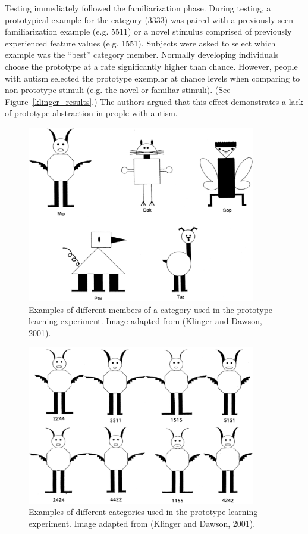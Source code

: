 Testing immediately followed the familiarization phase.  During testing, a prototypical example for the category (3333) was paired with a previously seen familiarization example (e.g. 5511) or a novel stimulus comprised of previously experienced feature values (e.g. 1551).  Subjects were asked to select which example was the ``best'' category member.  Normally developing individuals choose the prototype at a rate significantly higher than chance.  However, people with autism selected the prototype exemplar at chance levels when comparing to non-prototype stimuli (e.g. the novel or familiar stimuli). (See Figure~\ref{klinger_results}.)  The authors argued that this effect demonstrates a lack of prototype abstraction in people with autism.  

\begin{figure}[ht]
\begin{center}
	\includegraphics[width=100mm]{figures/prototype_categories.eps}
\end{center}
\caption{Examples of different members of a category used in the prototype learning experiment.  Image adapted from (Klinger and Dawson, 2001).}
\label{prototype-categories}
\end{figure} 

\begin{figure}[ht]
\begin{center}
	\includegraphics[width=100mm]{figures/mip_familiarization.eps}
\end{center}
\caption{Examples of different categories used in the prototype learning experiment.  Image adapted from (Klinger and Dawson, 2001).}
\label{mip-familiarization}
\end{figure} 

